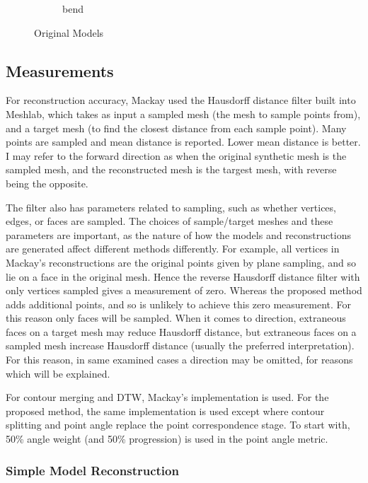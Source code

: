 \documentclass[11p, titlepage]{article}
\begin{document}
\begin{figure}[h!]
\begin{subfigure}[b]{0.3\textwidth}
         \caption{bend}
         \label{fig:bend}
     \end{subfigure}
        \caption{Original Models}
        \label{fig:original_models}
\end{figure}

\subsection{Measurements}

For reconstruction accuracy, Mackay used the Hausdorff distance filter built into Meshlab, which takes as input a sampled mesh (the mesh to sample points from), and a target mesh (to find the closest distance from each sample point). Many points are sampled and mean distance is reported. Lower mean distance is better. I may refer to the forward direction as when the original synthetic mesh is the sampled mesh, and the reconstructed mesh is the targest mesh, with reverse being the opposite. 

The filter also has parameters related to sampling, such as whether vertices, edges, or faces are sampled. The choices of sample/target meshes and these parameters are important, as the nature of how the models and reconstructions are generated affect different methods differently. For example, all vertices in Mackay's reconstructions are the original points given by plane sampling, and so lie on a face in the original mesh. Hence the reverse Hausdorff distance filter with only vertices sampled gives a measurement of zero. Whereas the proposed method adds additional points, and so is unlikely to achieve this zero measurement. For this reason only faces will be sampled. When it comes to direction, extraneous faces on a target mesh may reduce Hausdorff distance, but extraneous faces on a sampled mesh increase Hausdorff distance (usually the preferred interpretation). For this reason, in same examined cases a direction may be omitted, for reasons which will be explained.

For contour merging and DTW, Mackay's implementation is used. For the proposed method, the same implementation is used except where contour splitting and point angle replace the point correspondence stage. To start with, 50\% angle weight (and 50\% progression) is used in the point angle metric.
\pagebreak

\subsubsection{Simple Model Reconstruction}
\end{document}
